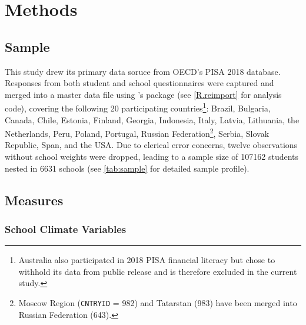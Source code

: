 \documentclass[a4paper,11pt,UKenglish,twoside,openright]{report}\usepackage[]{graphicx}\usepackage[]{color}
\begin{document}
\newpage



\newpage



\newpage



\newpage




\chapter{Methods}
\label{chp:3}

\section{Sample}

This study drew its primary data soruce from OECD's PISA 2018 database. Responses from both student \parencite{FLdata} and school questionnaires \parencite{SCHdata} were captured and merged into a master data file using \CR's \parencite[Version 4.0.5,][]{R}  package \parencite[Version 2.5,][]{intsvy} (see \cref{R.reimport} for analysis code), covering the following 20 participating countries\footnote{Australia also participated in 2018 PISA financial literacy but chose to withhold its data from public release and is therefore excluded in the current study.}: Brazil, Bulgaria, Canada, Chile, Estonia, Finland, Georgia, Indonesia, Italy, Latvia, Lithuania, the Netherlands, Peru, Poland, Portugal, Russian Federation\footnote{Moscow Region (\texttt{CNTRYID} = 982) and Tatarstan (983) have been merged into Russian Federation (643).}, Serbia, Slovak Republic, Span, and the USA. Due to clerical error concerns, twelve observations without school weights were dropped, leading to a sample size of 107162 students nested in 6631 schools (see \cref{tab:sample} for detailed sample profile).

\section{Measures}

\subsection{School Climate Variables}
\end{document}
